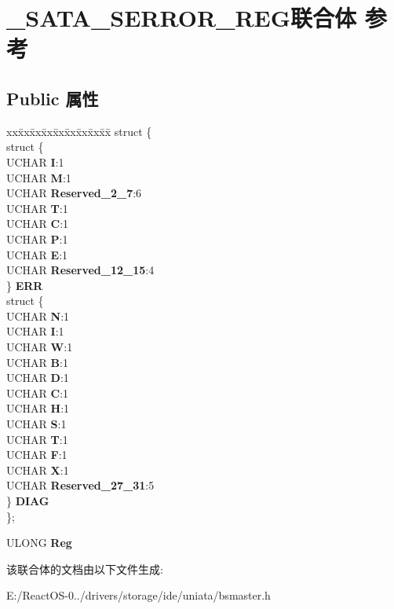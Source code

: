 \hypertarget{union___s_a_t_a___s_e_r_r_o_r___r_e_g}{}\section{\+\_\+\+S\+A\+T\+A\+\_\+\+S\+E\+R\+R\+O\+R\+\_\+\+R\+E\+G联合体 参考}
\label{union___s_a_t_a___s_e_r_r_o_r___r_e_g}
\subsection*{Public 属性}
\begin{DoxyCompactItemize}
\item 
\mbox{\label{union___s_a_t_a___s_e_r_r_o_r___r_e_g_a541952158619b6d4032c2985277faf90}} 
\begin{tabbing}
xx\=xx\=xx\=xx\=xx\=xx\=xx\=xx\=xx\=\kill
struct \{\\
\>struct \{\\
\>\>UCHAR {\bfseries I}:1\\
\>\>UCHAR {\bfseries M}:1\\
\>\>UCHAR {\bfseries Reserved\_2\_7}:6\\
\>\>UCHAR {\bfseries T}:1\\
\>\>UCHAR {\bfseries C}:1\\
\>\>UCHAR {\bfseries P}:1\\
\>\>UCHAR {\bfseries E}:1\\
\>\>UCHAR {\bfseries Reserved\_12\_15}:4\\
\>\} {\bfseries ERR}\\
\>struct \{\\
\>\>UCHAR {\bfseries N}:1\\
\>\>UCHAR {\bfseries I}:1\\
\>\>UCHAR {\bfseries W}:1\\
\>\>UCHAR {\bfseries B}:1\\
\>\>UCHAR {\bfseries D}:1\\
\>\>UCHAR {\bfseries C}:1\\
\>\>UCHAR {\bfseries H}:1\\
\>\>UCHAR {\bfseries S}:1\\
\>\>UCHAR {\bfseries T}:1\\
\>\>UCHAR {\bfseries F}:1\\
\>\>UCHAR {\bfseries X}:1\\
\>\>UCHAR {\bfseries Reserved\_27\_31}:5\\
\>\} {\bfseries DIAG}\\
\}; \\

\end{tabbing}\item 
\mbox{\label{union___s_a_t_a___s_e_r_r_o_r___r_e_g_a7eb6728767daa46c8cd806f71cff4584}} 
U\+L\+O\+NG {\bfseries Reg}
\end{DoxyCompactItemize}


该联合体的文档由以下文件生成\+:\begin{DoxyCompactItemize}
\item 
E\+:/\+React\+O\+S-\/0../drivers/storage/ide/uniata/bsmaster.\+h\end{DoxyCompactItemize}
